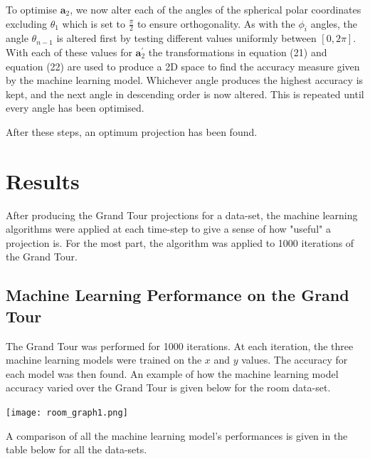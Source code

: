 \documentclass[a4paper,11pt,twoside]{article}
\begin{document}
To optimise $\bm{a}_2$, we now alter each of the angles of the spherical polar coordinates excluding $\theta_1$ which is set to $\frac{\pi}{2}$ to ensure orthogonality. As with the $\phi_i$ angles, the angle $\theta_{n-1}$ is altered first by testing different values uniformly between $[0, 2\pi]$. With each of these values for $\bm{a}_2^{\prime}$ the transformations in equation (21) and equation (22) are used to produce a 2D space to find the accuracy measure given by the machine learning model. Whichever angle produces the highest accuracy is kept, and the next angle in descending order is now altered. This is repeated until every angle has been optimised.
\newline

After these steps, an optimum projection has been found.
\newpage
\section{Results}

After producing the Grand Tour projections for a data-set, the machine learning algorithms were applied at each time-step to give a sense of how "useful" a projection is. For the most part, the algorithm was applied to 1000 iterations of the Grand Tour.
\subsection{Machine Learning Performance on the Grand Tour}

The Grand Tour was performed for 1000 iterations. At each iteration, the three machine learning models were trained on the $x$ and $y$ values. The accuracy for each model was then found. An example of how the machine learning model accuracy varied over the Grand Tour is given below for the room data-set.
\begin{center}
\texttt{[image: room\_graph1.png]}

\end{center}


A comparison of all the machine learning model's performances is given in the table below for all the data-sets.
\end{document}
